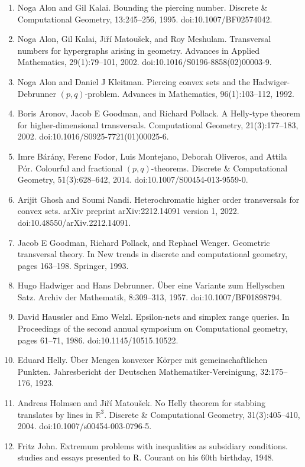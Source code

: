 \documentclass[10pt,a4paper]{amsart}
\begin{document}
\begin{enumerate}
\item[]  [1]  Noga Alon and Gil Kalai.  Bounding the piercing number.  Discrete \& Computational Geometry, 13:245–256, 1995.  doi:10.1007/BF02574042.  
\item[]  [2]  Noga Alon, Gil Kalai, Jiří Matoušek, and Roy Meshulam.  Transversal numbers for hypergraphs arising in geometry.  Advances in Applied Mathematics, 29(1):79–101, 2002.  doi:10.1016/S0196-8858(02)00003-9.  
\item[]  [3]  Noga Alon and Daniel J Kleitman.  Piercing convex sets and the Hadwiger-Debrunner $(p,q)$-problem.  Advances in Mathematics, 96(1):103–112, 1992.  
\item[]  [4]  Boris Aronov, Jacob E Goodman, and Richard Pollack.  A Helly-type theorem for higher-dimensional transversals.  Computational Geometry, 21(3):177–183, 2002.  doi:10.1016/S0925-7721(01)00025-6.  
\item[]  [5]  Imre Bárány, Ferenc Fodor, Luis Montejano, Deborah Oliveros, and Attila Pór.  Colourful and fractional $(p,q)$-theorems.  Discrete \& Computational Geometry, 51(3):628–642, 2014.  doi:10.1007/S00454-013-9559-0.  
\item[]  [6]  Arijit Ghosh and Soumi Nandi.  Heterochromatic higher order transversals for convex sets.  arXiv preprint arXiv:2212.14091 version 1, 2022.  doi:10.48550/arXiv.2212.14091.  
\item[]  [7]  Jacob E Goodman, Richard Pollack, and Rephael Wenger.  Geometric transversal theory.  In New trends in discrete and computational geometry, pages 163–198. Springer, 1993.  
\item[]  [8]  Hugo Hadwiger and Hans Debrunner.  Über eine Variante zum Hellyschen Satz.  Archiv der Mathematik, 8:309–313, 1957.  doi:10.1007/BF01898794.  
\item[]  [9]  David Haussler and Emo Welzl.  Epsilon-nets and simplex range queries.  In Proceedings of the second annual symposium on Computational geometry, pages 61–71, 1986.  doi:10.1145/10515.10522.  
\item[]  [10]  Eduard Helly.  Über Mengen konvexer Körper mit gemeinschaftlichen Punkten.  Jahresbericht der Deutschen Mathematiker-Vereinigung, 32:175–176, 1923.  
\item[]  [11]  Andreas Holmsen and Jiří Matoušek.  No Helly theorem for stabbing translates by lines in $\mathbb{R}^{3}$.  Discrete \& Computational Geometry, 31(3):405–410, 2004.  doi:10.1007/s00454-003-0796-5.  
\item[]  [12]  Fritz John.  Extremum problems with inequalities as subsidiary conditions. studies and essays presented to R. Courant on his 60th birthday, 1948.  

\end{enumerate}
\end{document}
